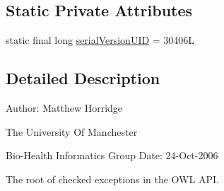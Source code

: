 \subsection*{Static Private Attributes}
\begin{DoxyCompactItemize}
\item 
static final long \hyperlink{classorg_1_1semanticweb_1_1owlapi_1_1model_1_1_o_w_l_exception_af00537c310cc7e91f08446c29b6927e6}{serial\-Version\-U\-I\-D} = 30406\-L
\end{DoxyCompactItemize}


\subsection{Detailed Description}
Author\-: Matthew Horridge\par
 The University Of Manchester\par
 Bio-\/\-Health Informatics Group Date\-: 24-\/\-Oct-\/2006

The root of checked exceptions in the O\-W\-L A\-P\-I. 

